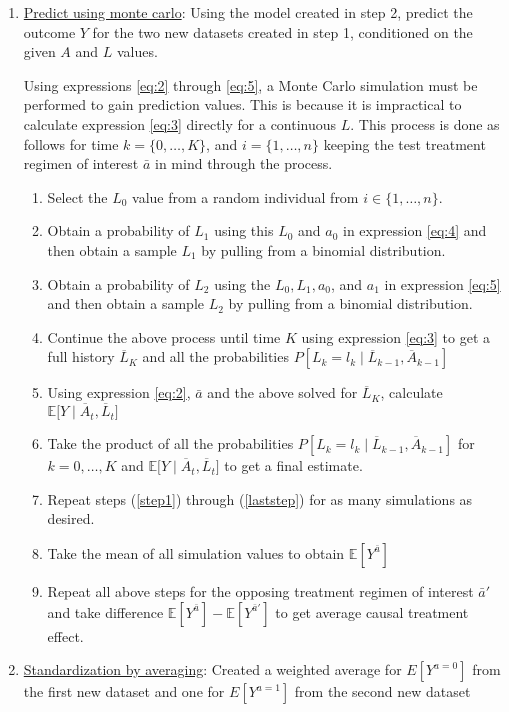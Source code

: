 \begin{enumerate}
\item \underline{Predict using monte carlo}: Using the model created in step 2, predict the outcome $Y$ for the two new datasets created in step 1, conditioned on the given $A$ and $L$ values.  

Using expressions \ref{eq:2} through \ref{eq:5}, a Monte Carlo simulation must be performed to gain prediction values.  This is because it is impractical to calculate expression \ref{eq:3} directly for a continuous $L$.  This process is done as follows for time $k = \{ 0, \dots, K \}$, and $i = \{ 1, \dots, n \}$ keeping the test treatment regimen of interest $\bar{a}$ in mind through the process.  
\begin{enumerate} 
\item Select the $L_0$ value from a random individual from $i \in  \{ 1, \dots, n \}$. \label{step1}  
\item Obtain a probability of $L_1$ using this $L_0$ and $a_0$ in expression \ref{eq:4} and then obtain a sample $L_1$ by pulling from a binomial distribution.  
\item Obtain a probability of $L_2$ using the $L_0, L_1, a_0$, and $a_1$ in expression \ref{eq:5} and then obtain a sample $L_2$ by pulling from a binomial distribution.  
\item Continue the above process until time $K$ using expression \ref{eq:3} to get a full history $\overline{L}_K$ and all the probabilities $P[L_k = l_k \mid  \overline{L}_{k-1}, \overline{A}_{k-1}]$ 
\item Using expression \ref{eq:2}, $\bar{a}$ and the above solved for $\overline{L}_K$, calculate $\mathbb{E} \big[Y \mid \overline{A}_t, \overline{L}_t \big]$ 
\item Take the product of all the probabilities $P[L_k = l_k \mid  \overline{L}_{k-1}, \overline{A}_{k-1}]$ for $k = 0, \dots, K$ and $\mathbb{E} \big[Y \mid \overline{A}_t, \overline{L}_t \big]$ to get a final estimate.  \label{laststep}
\item Repeat steps (\ref{step1}) through (\ref{laststep}) for as many simulations as desired.  
\item Take the mean of all simulation values to obtain $\mathbb{E}[Y^{\bar{a}}]$ 
\item Repeat all above steps for the opposing treatment regimen of interest $\bar{a}'$ and take difference $\mathbb{E}[Y^{\bar{a}}] - \mathbb{E}[Y^{\bar{a}'}]$ to get average causal treatment effect.  
\end{enumerate}

\item \underline{Standardization by averaging}:  Created a weighted average for $E[Y^{a=0}]$ from the first new dataset and one for $E[Y^{a=1}]$ from the second new dataset
\end{enumerate} 


